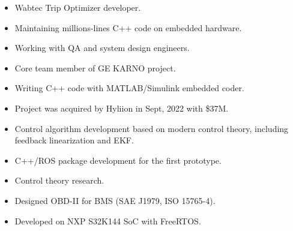 \documentclass[10pt,a4paper,ragged2e,withhyper]{altacv}
\begin{document}
\begin{paracol}{2}

    \begin{itemize}
        \item Wabtec Trip Optimizer\textsuperscript{\textregistered} developer.
        \item Maintaining millions-lines C++ code on embedded hardware.
        \item Working with QA and system design engineers.
    \end{itemize}

    \divider

    \begin{itemize}
        \item Core team member of GE KARNO\textsuperscript{\textregistered} project.
        \item Writing C++ code with MATLAB/Simulink embedded coder.
        \item Project was acquired by Hyliion in Sept, 2022 with \$37M.
    \end{itemize}

    \divider

    \begin{itemize}
        \item Control algorithm development based on modern control theory,
        including feedback linearization and EKF.
        \item C++/ROS package development for the first prototype.
    \end{itemize}

    \divider

    \begin{itemize}
        \item Control theory research.
    \end{itemize}

    \divider

    \begin{itemize}
        \item Designed OBD-II for BMS (SAE J1979, ISO 15765-4).
        \item Developed on NXP S32K144 SoC with FreeRTOS.
    \end{itemize}


\end{paracol}
\end{document}
